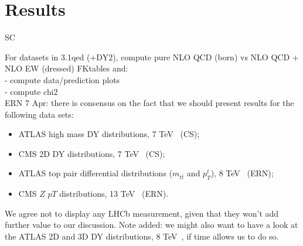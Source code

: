 \section{Results}
\label{sec:results}

SC

For datasets in 3.1qed (+DY2), compute pure NLO QCD (born) vs NLO QCD + NLO EW (dressed) FKtables and:\\
- compute data/prediction plots\\
- compute chi2\\

ERN 7 Apr: there is consensus on the fact that we should present results for the
following data sets:
\begin{itemize}
\item ATLAS high mass DY distributions, 7 TeV~\cite{Aad:2013iua} (CS);
\item CMS 2D DY distributions, 7 TeV~\cite{Chatrchyan:2013tia} (CS);
\item ATLAS top pair differential distributions ($m_{t\bar{t}}$ and $p_T^t$), 
8 TeV~\cite{Aad:2015mbv} (ERN);
\item CMS $Z$ $pT$ distributions, 13 TeV~\cite{Sirunyan:2019bzr} (ERN).
\end{itemize}

We agree not to display any LHCb measurement, given that they won't add
further value to our discussion.
Note added: we might also want to have a look at the ATLAS 2D and 3D DY 
distributions, 8 TeV~\cite{Aad:2016zzw,Aaboud:2017ffb}, if time allows 
us to do so.

